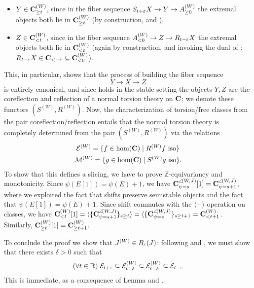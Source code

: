 \begin{itemize}
\item $Y\in \mathbf{C}^{(W)}_{\geq t}$, since in the fiber sequence $S_{t+\varepsilon}X\to Y\to A_{\ge 0}^{(W)}$ the extremal objects both lie in $\mathbf{C}^{(W)}_{\geq t}$ (by construction, and \acor {}),
\item $Z\in \mathbf{C}^{(W)}_{< t}$, since in the fiber sequence $A_{<0}^{(W)}\to Z\to R_{t-\varepsilon} X$ the extremal objects both lie in $\mathbf{C}^{(W)}_{< t}$ (again by construction, and invoking the dual of \acor {}: $R_{t-\varepsilon} X \in \mathbf{C}_{<-\varepsilon}\subseteq \mathbf{C}_{<0}^{(W)}$).
\end{itemize}
This, in particular, shows that the process of building the fiber sequence
\[
Y\to X\to Z
\]
is entirely canonical, and since \cite[\textbf{3.1}]{RT} holds in the stable setting the objects $Y,Z$ are the coreflection and reflection of a normal torsion theory on $\mathbf{C}$; we denote these functors $(S^{(W)}, R^{(W)})$. Now, the characterization of torsion\fshyp{}free classes from the pair coreflection\fshyp{}reflection entails that the normal torsion theory is completely determined from the pair $(S^{(W)}, R^{(W)})$ via the relations
\begin{gather*}
\mathcal{E}^{(W)} = \{f\in\text{hom}(\mathbf{C})\mid R^{(W)}f \text{ iso}\} \\
\mathcal{M}^{(W)} = \{g\in\text{hom}(\mathbf{C})\mid S^{(W)}g \text{ iso}\}.
\end{gather*}
To show that this defines a slicing, we have to prove $\mathbb Z$\hyp{}equivariancy and monotonicity. Since $\psi(E[1])=\psi(E)+1$, we have $\mathbf{C}^{\angle\!(W,J)}_{\psi=s}[1]=\mathbf{C}^{\angle\!(W,J)}_{\psi=s+1}$, where we exploited the fact that shifts preserve semistable objects and the fact that $\psi(E[1])=\psi(E)+1$. Since shift commutes with the $\langle-\rangle$ operation on classes, we have $\mathbf{C}^{(W)}_{< t}[1]=\langle \{\mathbf{C}^{\angle\!(W,J)}_{\psi=s+1}\}_{s\geq t}\rangle=\langle \{\mathbf{C}^{\angle\!(W,J)}_{\psi=s}\}_{s\geq t+1}=\mathbf{C}^{(W)}_{< t+1}$. Similarly, $\mathbf{C}^{(W)}_{\geq t}[1]=\mathbf{C}^{(W)}_{\geq t+1}$.

To conclude the proof we show that $J^{(W)}\in B_\varepsilon(J)$: following \adef {} and \aprop {}, we must show that there exists $\delta >0$ such that 
\[
(\forall t\in\mathbb{R})\;\mathcal{E}_{t+\varepsilon} \subseteq \mathcal{E}^{(W)}_{t+\delta} \subseteq \mathcal{E}^{(W)}_{t-\delta} \subseteq \mathcal{E}_{t-\varepsilon}
\]
This is immediate, as a consequence of Lemma  and \acor {}.
